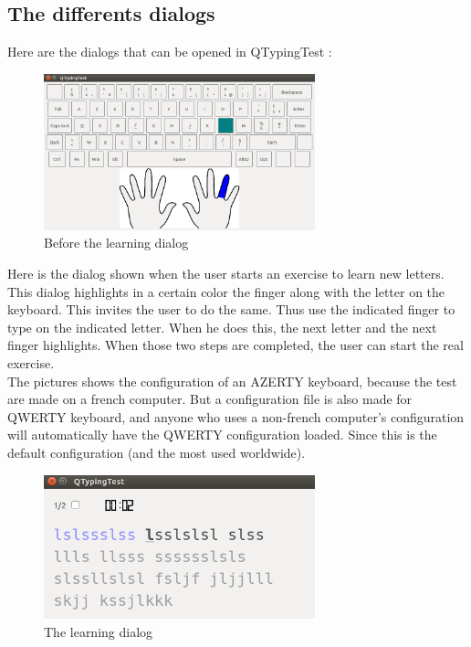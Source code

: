 \subsection{The differents dialogs}
Here are the dialogs that can be opened in QTypingTest :

\begin{figure}[H]
	\centering
	\includegraphics[width=0.7\textwidth]{images/dialog-before-learn.png}
	 \caption{Before the learning dialog}
	 \label{dialog-before-learn}
\end{figure}

Here is the dialog shown when the user starts an exercise to learn new letters.\\
This dialog highlights in a certain color the finger along with the letter on the keyboard. This invites the user to do the same. Thus use the indicated finger to type on the indicated letter. When he does this, the next letter and the next finger highlights. When those two steps are completed, the user can start the real exercise.\\
The pictures shows the configuration of an AZERTY keyboard, because the test are made on a french computer. But a configuration file is also made for QWERTY keyboard, and anyone who uses a non-french computer's configuration will automatically have the QWERTY configuration loaded. Since this is the default configuration (and the most used worldwide).

\begin{figure}[H]
	\centering
	\includegraphics[width=0.7\textwidth]{images/dialog-learn.png}
	 \caption{The learning dialog}
	 \label{dialog-learn}
\end{figure}


